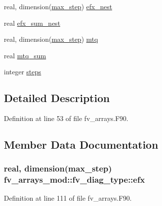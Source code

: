 \begin{DoxyCompactItemize}
\item 
real, dimension(\hyperlink{classfv__arrays__mod_a9e487a715273ca3c6572693756bcec1b}{max\-\_\-step}) \hyperlink{structfv__arrays__mod_1_1fv__diag__type_af5695e644a6f2604bcb2cd502f534804}{efx\-\_\-nest}
\item 
real \hyperlink{structfv__arrays__mod_1_1fv__diag__type_a32a6f4014260bb3c0867fda0563f4c12}{efx\-\_\-sum\-\_\-nest}
\item 
real, dimension(\hyperlink{classfv__arrays__mod_a9e487a715273ca3c6572693756bcec1b}{max\-\_\-step}) \hyperlink{structfv__arrays__mod_1_1fv__diag__type_a26ee238f8ade03f3f0b266664416b8f8}{mtq}
\item 
real \hyperlink{structfv__arrays__mod_1_1fv__diag__type_aba97005878999cb1d0ec569e7e8c5ec8}{mtq\-\_\-sum}
\item 
integer \hyperlink{structfv__arrays__mod_1_1fv__diag__type_a2dfa52c702f772c7ce4d8935a9b237df}{steps}
\end{DoxyCompactItemize}


\subsection{Detailed Description}


Definition at line 53 of file fv\-\_\-arrays.\-F90.



\subsection{Member Data Documentation}
\subsubsection[{efx}]{\setlength{\rightskip}{0pt plus 5cm}real, dimension({\bf max\-\_\-step}) fv\-\_\-arrays\-\_\-mod\-::fv\-\_\-diag\-\_\-type\-::efx}\label{structfv__arrays__mod_1_1fv__diag__type_a3a82cb7f95dd84492be39b9aac99fd16}


Definition at line 111 of file fv\-\_\-arrays.\-F90.


